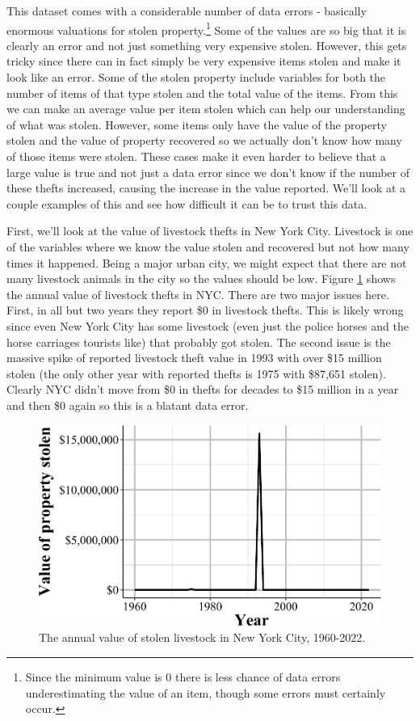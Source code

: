 \documentclass[
  12pt,
  openany]{book}
\begin{document}
This dataset comes with a considerable number of data errors - basically enormous valuations for stolen property.\footnote{Since the minimum value is 0 there is less chance of data errors underestimating the value of an item, though some errors must certainly occur.} Some of the values are so big that it is clearly an error and not just something very expensive stolen. However, this gets tricky since there can in fact simply be very expensive items stolen and make it look like an error. Some of the stolen property include variables for both the number of items of that type stolen and the total value of the items. From this we can make an average value per item stolen which can help our understanding of what was stolen. However, some items only have the value of the property stolen and the value of property recovered so we actually don't know how many of those items were stolen. These cases make it even harder to believe that a large value is true and not just a data error since we don't know if the number of these thefts increased, causing the increase in the value reported. We'll look at a couple examples of this and see how difficult it can be to trust this data.

First, we'll look at the value of livestock thefts in New York City. Livestock is one of the variables where we know the value stolen and recovered but not how many times it happened. Being a major urban city, we might expect that there are not many livestock animals in the city so the values should be low. Figure \ref{fig:nycLivestock} shows the annual value of livestock thefts in NYC. There are two major issues here. First, in all but two years they report \$0 in livestock thefts. This is likely wrong since even New York City has some livestock (even just the police horses and the horse carriages tourists like) that probably got stolen. The second issue is the massive spike of reported livestock theft value in 1993 with over \$15 million stolen (the only other year with reported thefts is 1975 with \$87,651 stolen). Clearly NYC didn't move from \$0 in thefts for decades to \$15 million in a year and then \$0 again so this is a blatant data error.

\begin{figure}

{\centering \includegraphics[width=0.9\linewidth]{04_stolen_property_files/figure-latex/nycLivestock-1} 

}

\caption{The annual value of stolen livestock in New York City, 1960-2022.}\label{fig:nycLivestock}
\end{figure}
\end{document}
